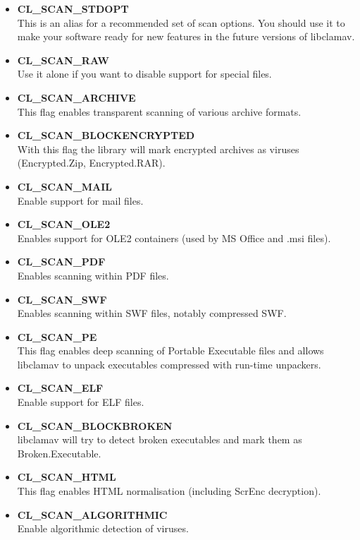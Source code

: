 \documentclass[a4paper,titlepage,12pt]{article}
\begin{document}
    \begin{itemize}
	\item \textbf{CL\_SCAN\_STDOPT}\\
	      This is an alias for a recommended set of scan options. You
	      should use it to make your software ready for new features
	      in the future versions of libclamav.
	\item \textbf{CL\_SCAN\_RAW}\\
	      Use it alone if you want to disable support for special files.
	\item \textbf{CL\_SCAN\_ARCHIVE}\\
	      This flag enables transparent scanning of various archive formats.
	\item \textbf{CL\_SCAN\_BLOCKENCRYPTED}\\
	      With this flag the library will mark encrypted archives as viruses
	      (Encrypted.Zip, Encrypted.RAR).
	\item \textbf{CL\_SCAN\_MAIL}\\
	      Enable support for mail files.
	\item \textbf{CL\_SCAN\_OLE2}\\
	      Enables support for OLE2 containers (used by MS Office and .msi
	      files).
	\item \textbf{CL\_SCAN\_PDF}\\
	      Enables scanning within PDF files.
	\item \textbf{CL\_SCAN\_SWF}\\
	      Enables scanning within SWF files, notably compressed SWF.
	\item \textbf{CL\_SCAN\_PE}\\
	      This flag enables deep scanning of Portable Executable files and
	      allows libclamav to unpack executables compressed with run-time
	      unpackers.
	\item \textbf{CL\_SCAN\_ELF}\\
	      Enable support for ELF files.
	\item \textbf{CL\_SCAN\_BLOCKBROKEN}\\
	      libclamav will try to detect broken executables and mark them as
	      Broken.Executable.
	\item \textbf{CL\_SCAN\_HTML}\\
	      This flag enables HTML normalisation (including ScrEnc
	      decryption).
	\item \textbf{CL\_SCAN\_ALGORITHMIC}\\
	      Enable algorithmic detection of viruses.

\end{itemize}
\end{document}
